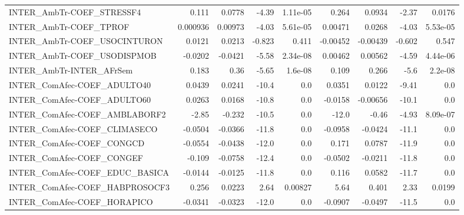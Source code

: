 \begin{tabular}{lrrrrrrrr}
INTER\_AmbTr-COEF\_STRESSF4              &       0.111 &       0.0778 &    -4.39 & 1.11e-05 &      0.264 &      0.0934 &        -2.37 &        0.0176 \\
INTER\_AmbTr-COEF\_TPROF                 &    0.000936 &      0.00973 &    -4.03 & 5.61e-05 &    0.00471 &      0.0268 &        -4.03 &      5.53e-05 \\
INTER\_AmbTr-COEF\_USOCINTURON           &      0.0121 &       0.0213 &   -0.823 &    0.411 &   -0.00452 &    -0.00439 &       -0.602 &         0.547 \\
INTER\_AmbTr-COEF\_USODISPMOB            &     -0.0202 &      -0.0421 &    -5.58 & 2.34e-08 &    0.00462 &     0.00562 &        -4.59 &      4.44e-06 \\
INTER\_AmbTr-INTER\_AFrSem               &       0.183 &         0.36 &    -5.65 &  1.6e-08 &      0.109 &       0.266 &         -5.6 &       2.2e-08 \\
INTER\_ComAfec-COEF\_ADULTO40            &      0.0439 &       0.0241 &    -10.4 &      0.0 &     0.0351 &      0.0122 &        -9.41 &           0.0 \\
INTER\_ComAfec-COEF\_ADULTO60            &      0.0263 &       0.0168 &    -10.8 &      0.0 &    -0.0158 &    -0.00656 &        -10.1 &           0.0 \\
INTER\_ComAfec-COEF\_AMBLABORF2          &       -2.85 &       -0.232 &    -10.5 &      0.0 &      -12.0 &       -0.46 &        -4.93 &      8.09e-07 \\
INTER\_ComAfec-COEF\_CLIMASECO           &     -0.0504 &      -0.0366 &    -11.8 &      0.0 &    -0.0958 &     -0.0424 &        -11.1 &           0.0 \\
INTER\_ComAfec-COEF\_CONGCD              &     -0.0554 &      -0.0438 &    -12.0 &      0.0 &      0.171 &      0.0787 &        -11.9 &           0.0 \\
INTER\_ComAfec-COEF\_CONGEF              &      -0.109 &      -0.0758 &    -12.4 &      0.0 &    -0.0502 &     -0.0211 &        -11.8 &           0.0 \\
INTER\_ComAfec-COEF\_EDUC\_BASICA         &     -0.0144 &      -0.0125 &    -11.8 &      0.0 &      0.116 &      0.0582 &        -11.7 &           0.0 \\
INTER\_ComAfec-COEF\_HABPROSOCF3         &       0.256 &       0.0223 &     2.64 &  0.00827 &       5.64 &       0.401 &         2.33 &        0.0199 \\
INTER\_ComAfec-COEF\_HORAPICO            &     -0.0341 &      -0.0323 &    -12.0 &      0.0 &    -0.0907 &     -0.0497 &        -11.5 &           0.0 \\

\end{tabular}
